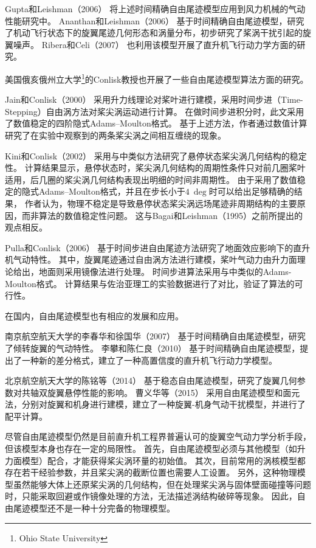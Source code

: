 Gupta和Leishman（2006）
将上述时间精确自由尾迹模型应用到风力机械的气动性能研究中。
%
Ananthan和Leishman（2006）
基于时间精确自由尾迹模型，研究了机动飞行状态下的旋翼尾迹几何形态和涡量分布，初步研究了桨涡干扰引起的旋翼噪声。
Ribera和Celi（2007）
也利用该模型开展了直升机飞行动力学方面的研究。

美国俄亥俄州立大学\footnote{Ohio State University}的Conlisk教授也开展了一些自由尾迹模型算法方面的研究。

Jain和Conlisk（2000）
采用升力线理论对桨叶进行建模，采用时间步进（Time-Stepping）自由涡方法对桨尖涡运动进行计算。
在做时间步进积分时，此文采用了数值稳定的四阶隐式Adams–Moulton格式。
基于上述方法，作者通过数值计算研究了在实验中观察到的两条桨尖涡之间相互缠绕的现象。

Kini和Conlisk（2002）
采用与\cite{Jain2000}中类似方法研究了悬停状态桨尖涡几何结构的稳定性。
计算结果显示，悬停状态时，桨尖涡几何结构的周期性条件只对前几圈桨叶适用，后几圈的桨尖涡几何结构表现出明细的时间非周期性。
由于采用了数值稳定的隐式Adams–Moulton格式，并且在步长小于$4~\deg$时可以给出足够精确的结果，
作者认为，物理不稳定是导致悬停状态桨尖涡远场尾迹非周期结构的主要原因，而非算法的数值稳定性问题。
这与Bagai和Leishman（1995）之前所提出的观点相反。

Pulla和Conlisk（2006）
基于时间步进自由尾迹方法研究了地面效应影响下的直升机气动特性。
其中，旋翼尾迹通过自由涡方法进行建模，桨叶气动力由升力面理论给出，地面则采用镜像法进行处理。
时间步进算法采用与\cite{Jain2000,Kini2002}中类似的Adams-Moulton格式。
计算结果与佐治亚理工的实验数据进行了对比，验证了算法的可行性。

在国内，自由尾迹模型也有相应的发展和应用。

南京航空航天大学的李春华和徐国华（2007）
基于时间精确自由尾迹模型，研究了倾转旋翼的气动特性。
%
李攀和陈仁良（2010）
基于时间精确自由尾迹模型，提出了一种新的差分格式，建立了一种高置信度的直升机飞行动力学模型。

北京航空航天大学的陈铭等（2014）
基于稳态自由尾迹模型，研究了旋翼几何参数对共轴双旋翼悬停性能的影响。
%
曹义华等（2015）
采用自由尾迹模型和面元法，分别对旋翼和机身进行建模，建立了一种旋翼-机身气动干扰模型，并进行了配平计算。

尽管自由尾迹模型仍然是目前直升机工程界普遍认可的旋翼空气动力学分析手段，但该模型本身也存在一定的局限性。
首先，自由尾迹模型必须与其他模型（如升力面模型）配合，才能获得桨尖涡环量的初始值。
其次，目前常用的涡核模型都存在若干经验参数，并且桨尖涡的截断位置也需要人工设置。
另外，这种物理模型虽然能够大体上还原桨尖涡的几何结构，但在处理桨尖涡与固体壁面碰撞等问题时，只能采取回避或作镜像处理的方法，无法描述涡结构破碎等现象。
因此，自由尾迹模型还不是一种十分完备的物理模型。

